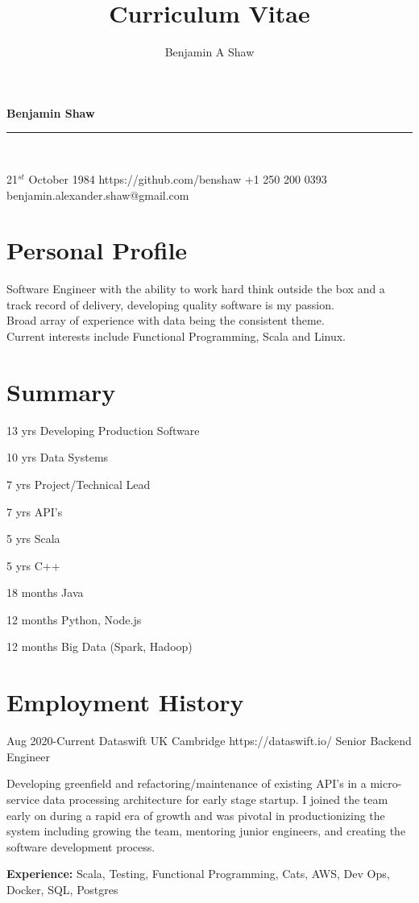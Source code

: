 \documentclass{article}
\title{Curriculum Vitae}
\author{Benjamin A Shaw}
\begin{document}
{\huge{\color{slateblue}\textbf{Benjamin Shaw}}}\\
\rule{\textwidth}{0.5mm}\\

\begin{personaldetails}
{21$^{st}$ October 1984}
{https://github.com/benshaw}
{+1 250 200 0393}
{benjamin.alexander.shaw@gmail.com}
\end{personaldetails}


\section*{Personal Profile}
\begin{profile}
Software Engineer with the ability to work hard think outside the box and a track record of delivery, developing quality software is my passion. \\
Broad array of experience with data being the consistent theme.\\
Current interests include Functional Programming, Scala and Linux.\\
\end{profile}

\section*{Summary}
\begin{itemize-spaced}
  \item 13 yrs Developing Production Software
  \item 10 yrs Data Systems  
  \item 7 yrs Project/Technical Lead
  \item 7 yrs API's
  \item 5 yrs Scala 
  \item 5 yrs C++
  \item 18 months Java
  \item 12 months Python, Node.js
  \item 12 months Big Data (Spark, Hadoop)
\end{itemize-spaced}

\section*{Employment History}

\begin{job}
{Aug 2020-}{Current}
{Dataswift UK Cambridge}
{https://dataswift.io/}
{Senior Backend Engineer}%
{Developing greenfield and refactoring/maintenance of existing API's in a micro-service data processing architecture for early stage startup.  I joined the team early on during a rapid era of growth and was pivotal in productionizing the system including growing the team, mentoring junior engineers, and creating the software development process.  \\
\rule{0mm}{5mm}\textbf{Experience:} Scala, Testing, Functional Programming, Cats, AWS, Dev Ops, Docker, SQL, Postgres}
\end{job}
\end{document}
